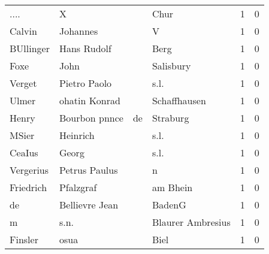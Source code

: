 \begin{center}
\begin{tiny}
\begin{longtabu}{llllrr}
                     .... &                                  X &             &                                        Chur &          1 &         0 \\
                   Calvin &                           Johannes &             &                                           V &          1 &         0 \\
                BUllinger &                        Hans Rudolf &             &                                        Berg &          1 &         0 \\
                     Foxe &                               John &             &                                   Salisbury &          1 &         0 \\
                   Verget &                       Pietro Paolo &             &                                        s.l. &          1 &         0 \\
                    Ulmer &                      ohatin Konrad &             &                                Schaffhausen &          1 &         0 \\
                    Henry &                      Bourbon pnnce &          de &                                    Straburg &          1 &         0 \\
                    MSier &                           Heinrich &             &                                        s.l. &          1 &         0 \\
                   CeaIus &                              Georg &             &                                        s.l. &          1 &         0 \\
                Vergerius &                      Petrus Paulus &             &                                           n &          1 &         0 \\
                Friedrich &                          Pfalzgraf &             &                                    am Bhein &          1 &         0 \\
                       de &                     Bellievre Jean &             &                                      BadenG &          1 &         0 \\
                        m &                               s.n. &             &                           Blaurer Ambresius &          1 &         0 \\
                  Finsler &                               osua &             &                                        Biel &          1 &         0 \\

\end{longtabu}
\end{tiny}
\end{center}
